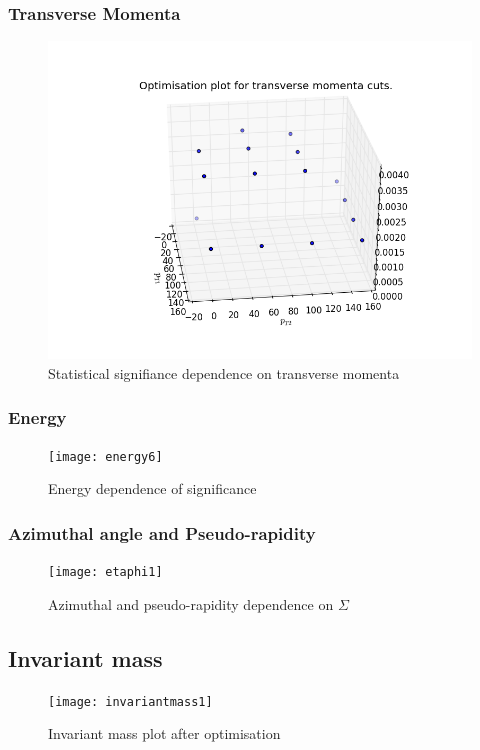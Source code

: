 \documentclass{article}
\begin{document}
\subsubsection{Transverse Momenta}
\begin{figure}
\includegraphics[scale=0.5]{transverse6}
\caption{Statistical signifiance dependence on transverse momenta}
\end{figure}
\subsubsection{Energy}
\begin{figure}
\texttt{[image: energy6]}
\caption{Energy dependence of significance}
\end{figure}
\subsubsection{Azimuthal angle and Pseudo-rapidity}
\begin{figure}
\texttt{[image: etaphi1]}
\caption{Azimuthal and pseudo-rapidity dependence on $\Sigma$}
\end{figure}
\subsection{Invariant mass}
\begin{figure}
\texttt{[image: invariantmass1]}
\caption{Invariant mass plot after optimisation}
\end{figure}
\end{document}
